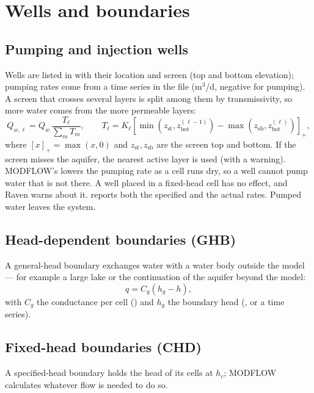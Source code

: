 \section{Wells and boundaries}\label{ch:wells}
\subsection{Pumping and injection wells}
Wells are listed in  with their location and screen (top and bottom elevation); pumping rates come from a
time series  in the  file (m$^3$/d, negative for pumping). A screen that crosses several layers
is split among them by transmissivity, so more water comes from the more permeable layers:
\begin{equation}
Q_{w,\ell}=Q_w\,\frac{T_\ell}{\sum_mT_m},\qquad
T_\ell=K_\ell\left[\min\!\left(z_{\mathrm{st}},z^{(\ell-1)}_{\mathrm{bot}}\right)-\max\!\left(z_{\mathrm{sb}},z^{(\ell)}_{\mathrm{bot}}\right)\right]_+,
\end{equation}
where $[x]_+=\max(x,0)$ and $z_{\mathrm{st}},z_{\mathrm{sb}}$ are the screen top and bottom. If the screen misses the
aquifer, the nearest active layer is used (with a warning). MODFLOW's  lowers the pumping rate as a cell runs dry, so a well cannot pump water that is not
there. A well placed in a fixed-head cell has no effect, and Raven warns about it.  reports both the
specified and the actual rates. Pumped water leaves the system.

\subsection{Head-dependent boundaries (GHB)}
A general-head boundary exchanges water with a water body outside the model --- for example a large lake or the
continuation of the aquifer beyond the model:
\begin{equation}
q=C_g\left(h_g-h\right),
\end{equation}
with $C_g$ the conductance per cell () and $h_g$ the boundary head (, or a 
time series).

\subsection{Fixed-head boundaries (CHD)}
A specified-head boundary holds the head of its cells at $h_c$; MODFLOW calculates whatever flow is needed to do so.

